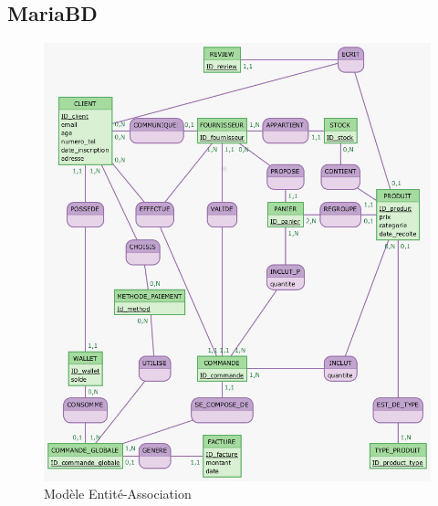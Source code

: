 \documentclass[a4paper,12pt]{report}
\theoremstyle{break}
\theoremstyle{break}
\theoremstyle{break}
\theoremstyle{break}
\theoremstyle{definition}
\theoremstyle{remark}
\begin{document}
\subsection{MariaBD}
\begin{figure}[!ht]
  \centering
  \includegraphics[scale=0.6]{images/Clients.jpg}
  \caption{Modèle Entité-Association}
  \label{fig:modele_EA}
\end{figure}
\end{document}
